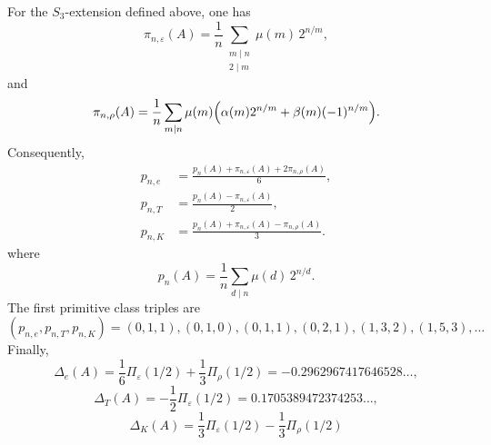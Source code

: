 \begin{corollary}
  \label{cor:s3-example-profile}
  For the \(S_3\)-extension defined above, one has
  \begin{equation}\label{eq:s3-example-primitive-sign-coefficients}
    \pi_{n,\varepsilon}(A)
    =
    \frac{1}{n}
      \sum_{\substack{m\mid n\\ 2\mid m}}
        \mu(m)\,2^{n/m},
  \end{equation}
  and
  \begin{equation}\label{eq:s3-example-primitive-rho-coefficients}
    \pi_{n,\rho}(A)
    =
    \frac{1}{n}
      \sum_{m\mid n}
        \mu(m)\Bigl(
          \alpha(m)2^{n/m}+\beta(m)(-1)^{n/m}
        \Bigr).
  \end{equation}
  Consequently,
  \begin{equation}\label{eq:s3-example-primitive-classes}
    \begin{aligned}
      p_{n,e}
      &=\frac{p_n(A)+\pi_{n,\varepsilon}(A)+2\pi_{n,\rho}(A)}{6}, \\
      p_{n,T}
      &=\frac{p_n(A)-\pi_{n,\varepsilon}(A)}{2}, \\
      p_{n,K}
      &=\frac{p_n(A)+\pi_{n,\varepsilon}(A)-\pi_{n,\rho}(A)}{3}.
    \end{aligned}
  \end{equation}
  where
  \begin{equation}\label{eq:s3-example-full-two-shift-primitive}
    p_n(A)=\frac{1}{n}\sum_{d\mid n}\mu(d)\,2^{n/d}.
  \end{equation}
  The first primitive class triples are
  \begin{equation}\label{eq:s3-example-primitive-first-terms}
    (p_{n,e},p_{n,T},p_{n,K})
    =(0,1,1),(0,1,0),(0,1,1),(0,2,1),(1,3,2),(1,5,3),\ldots
  \end{equation}
  Finally,
  \begin{equation}\label{eq:s3-example-delta-values}
    \Delta_e(A)
    =\frac16\Pi_\varepsilon(1/2)+\frac13\Pi_\rho(1/2)
    =-0.2962967417646528\ldots,
  \end{equation}
  \begin{equation}\label{eq:s3-example-delta-t-value}
    \Delta_T(A)
    =-\frac12\Pi_\varepsilon(1/2)
    =0.1705389472374253\ldots,
  \end{equation}
  \begin{equation}\label{eq:s3-example-delta-k-value}
    \Delta_K(A)
    =\frac13\Pi_\varepsilon(1/2)-\frac13\Pi_\rho(1/2)

\end{equation}
\end{corollary}

